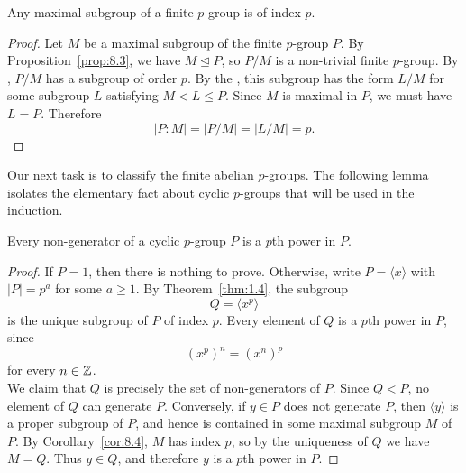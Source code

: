 \documentclass[../Odyssey_Project.tex]{subfiles}
\begin{document}
\begin{corollary}
\label{cor:8.4}
Any maximal subgroup of a finite $p$-group is of index $p$.
\end{corollary}
\begin{proof}
Let $M$ be a maximal subgroup of the finite $p$-group $P$. By Proposition~\ref{prop:8.3}, we have $M\trianglelefteq P$, so $P/M$ is a non-trivial finite $p$-group. By , $P/M$ has a subgroup of order $p$. By the , this subgroup has the form $L/M$ for some subgroup $L$ satisfying $M<L\leq P$. Since $M$ is maximal in $P$, we must have $L=P$. Therefore
\[
    \lvert P:M\rvert=\lvert P/M\rvert=\lvert L/M\rvert=p.
\]
\end{proof}

Our next task is to classify the finite abelian $p$-groups. The following lemma isolates the elementary fact about cyclic $p$-groups that will be used in the induction.

\begin{lemma}
\label{lem:8.5}
Every non-generator of a cyclic $p$-group $P$ is a $p$th power in $P$.
\end{lemma}
\begin{proof}
If $P=1$, then there is nothing to prove. Otherwise, write $P=\langle x\rangle$ with $\lvert P\rvert=p^a$ for some $a\geq 1$. By Theorem~\ref{thm:1.4}, the subgroup
\[
    Q=\langle x^p\rangle
\]
is the unique subgroup of $P$ of index $p$. Every element of $Q$ is a $p$th power in $P$, since
\[
    (x^p)^n=(x^n)^p
\]
for every $n\in \mathbb{Z}$.\\
We claim that $Q$ is precisely the set of non-generators of $P$. Since $Q<P$, no element of $Q$ can generate $P$. Conversely, if $y\in P$ does not generate $P$, then $\langle y\rangle$ is a proper subgroup of $P$, and hence is contained in some maximal subgroup $M$ of $P$. By Corollary~\ref{cor:8.4}, $M$ has index $p$, so by the uniqueness of $Q$ we have $M=Q$. Thus $y\in Q$, and therefore $y$ is a $p$th power in $P$.
\end{proof}
\end{document}

